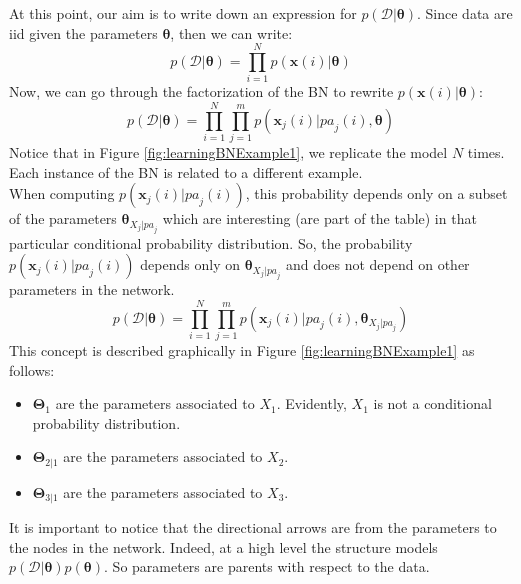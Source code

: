 At this point, our aim is to write down an expression for $p(\mathcal{D}|\pmb{\theta})$. Since data are iid given the parameters $\pmb{\theta}$, then we can write:
$$p(\mathcal{D}|\pmb{\theta}) = \prod_{i=1}^N p(\pmb{x}(i) | \pmb{\theta})$$
Now, we can go through the factorization of the BN to rewrite $p(\pmb{x}(i) | \pmb{\theta})$:
$$p(\mathcal{D}|\pmb{\theta}) = \prod_{i=1}^N \prod_{j=1}^m p(\pmb{x}_j(i) | \mathit{pa}_j(i), \pmb{\theta})$$
Notice that in Figure \ref{fig:learningBNExample1}, we replicate the model $N$ times. Each instance of the BN is related to a different example.\\
When computing $p(\pmb{x}_j(i) | \mathit{pa}_j(i))$, this probability depends only on a subset of the parameters $\pmb{\theta}_{X_j | \mathit{pa}_j}$ which are interesting (are part of the table) in that particular conditional probability distribution. So, the probability $p(\pmb{x}_j(i) | \mathit{pa}_j(i))$ depends only on $\pmb{\theta}_{X_j | \mathit{pa}_j}$ and does not depend on other parameters in the network.
\begin{equation}
\label{eq:factorizationLearningBN}
  p(\mathcal{D}|\pmb{\theta}) = \prod_{i=1}^N \prod_{j=1}^m p(\pmb{x}_j(i) | \mathit{pa}_j(i), \pmb{\theta}_{X_j | \mathit{pa}_j})  
\end{equation}
This concept is described graphically in Figure \ref{fig:learningBNExample1} as follows:
\begin{itemize}
    \item $\pmb{\Theta}_1$ are the parameters associated to $X_1$. Evidently, $X_1$ is not a conditional probability distribution.
    \item $\pmb{\Theta}_{2|1}$ are the parameters associated to $X_2$.
    \item $\pmb{\Theta}_{3|1}$ are the parameters associated to $X_3$.
\end{itemize}
It is important to notice that the directional arrows are from the parameters to the nodes in the network. Indeed, at a high level the structure models $p(\mathcal{D}|\pmb{\theta}) p(\pmb{\theta})$. So parameters are parents with respect to the data. \newline

